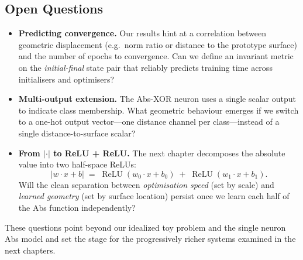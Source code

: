 \subsection*{Open Questions}

\begin{itemize}
    \item \textbf{Predicting convergence.}  
          Our results hint at a correlation between geometric displacement
          (e.g.\ norm ratio or distance to the prototype surface) and the
          number of epochs to convergence.  Can we define an invariant metric
          on the \emph{initial-final} state pair that reliably predicts
          training time across initialisers and optimisers?

    \item \textbf{Multi-output extension.}  
          The Abs-XOR neuron uses a single scalar output to indicate class
          membership.  What geometric behaviour emerges if we switch to a
          one-hot output vector—one distance channel per class—instead of a
          single distance-to-surface scalar?

    \item \textbf{From $\lvert\cdot\rvert$ to ReLU + ReLU.}  
          The next chapter decomposes the absolute value into two half-space
          ReLUs:  
          \[
              \lvert w\!\cdot\!x + b\rvert
              \;=\;
              \operatorname{ReLU}(w_0\!\cdot\!x + b_0)
              \;+\;
              \operatorname{ReLU}(w_1\!\cdot\!x + b_1).
          \]
          Will the clean separation between \emph{optimisation speed} (set by
          scale) and \emph{learned geometry} (set by surface location) persist
          once we learn each half of the Abs function independently?
\end{itemize}

These questions point beyond our idealized toy problem and the single 
neuron Abs model and set the stage for the progressively richer systems 
examined in the next chapters.
